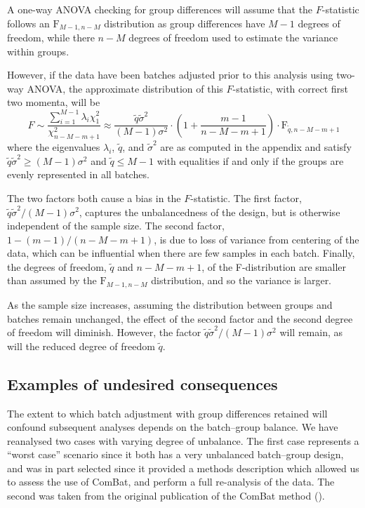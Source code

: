 \documentclass{bio}
\begin{document}
A one-way ANOVA checking for group differences will assume that the $F$-statistic follows an $\text{F}_{M-1,n-M}$ distribution as group differences have $M-1$ degrees of freedom, while there $n-M$ degrees of freedom used to estimate the variance within groups.

However, if the data have been batches adjusted prior to this analysis using two-way ANOVA, the approximate distribution of this $F$-statistic, with correct first two momenta, will be
\begin{equation}
F\sim\frac{\sum_{i=1}^{M-1}\lambda_i\chi^2_{1}}{\chi^2_{n-M-m+1}}
\approx\frac{\tilde q\tilde\sigma^2}{(M-1)\sigma^2}\cdot\left(1+\frac{m-1}{n-M-m+1}\right)\cdot\text{F}_{\tilde q,n-M-m+1}
\end{equation}
where the eigenvalues $\lambda_i$, $\tilde q$, and $\tilde\sigma^2$ are as computed in the appendix and satisfy $\tilde q\tilde\sigma^2\ge (M-1)\sigma^2$ and $\tilde q\le M-1$ with equalities if and only if the groups are evenly represented in all batches.

The two factors both cause a bias in the $F$-statistic. The first factor, $\tilde q\tilde\sigma^2/(M-1)\sigma^2$, captures the unbalancedness of the design, but is otherwise independent of the sample size. The second factor, $1-(m-1)/(n-M-m+1)$, is due to loss of variance from centering of the data, which can be influential when there are few samples in each batch. Finally, the degrees of freedom, $\tilde q$ and $n-M-m+1$, of the F-distribution are smaller than assumed by the $\text{F}_{M-1,n-M}$ distribution, and so the variance is larger.

As the sample size increases, assuming the distribution between groups and batches remain unchanged, the effect of the second factor and the second degree of freedom will diminish. However, the factor $\tilde q\tilde\sigma^2/(M-1)\sigma^2$ will remain, as will the reduced degree of freedom $\tilde q$.


\subsection{Examples of undesired consequences}

The extent to which batch adjustment with group differences retained will confound subsequent analyses depends on the batch--group balance. We have reanalysed two cases with varying degree of unbalance. The first case represents a ``worst case'' scenario since it both has a very unbalanced batch--group design, and was in part selected since it provided a methods description which allowed us to assess the use of ComBat, and perform a full re-analysis of the data. The second was taken from the original publication of the ComBat method (\citealp{Johnson2007}).
\end{document}
